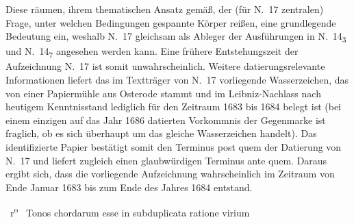\begin{ledgroup}
{Diese räumen, ihrem thematischen Ansatz gemäß, der (für N.~17 zentralen) Frage, unter welchen Bedingungen gespannte Körper reißen, eine grundlegende Bedeutung ein, weshalb N.~17 gleichsam als Ableger der Ausführungen in N.~14\textsubscript{3} und N.~14\textsubscript{7} angesehen werden kann.
Eine frühere Entstehungszeit der Aufzeichnung N.~17 ist somit unwahrscheinlich.
}%
\pend%
\pstart%
\footnotesize{
Weitere datierungsrelevante Informationen liefert das im Textträger von N.~17 vorliegende Wasserzeichen, das von einer Papiermühle aus Osterode stammt und im Leibniz-Nachlass nach heutigem Kenntnisstand lediglich für den Zeitraum 1683 bis 1684 belegt ist (bei einem einzigen auf das Jahr 1686 datierten Vorkommnis der Gegenmarke ist fraglich, ob es sich überhaupt um das gleiche Wasserzeichen handelt).%
\protect{}%
\protect{}
Das identifizierte Papier bestätigt somit den Terminus post quem der Datierung von N.~17 und liefert zugleich einen glaubwürdigen Terminus ante quem.
Daraus ergibt sich, dass die vorliegende Aufzeichnung wahrscheinlich im Zeitraum von Ende Januar 1683 bis zum Ende des Jahres 1684 entstand.
}%
\pend
\end{ledgroup}
\newpage
%
%
\count{}
\count{}
\count{}
\pstart%
\normalsize%
\noindent%
%
~r\textsuperscript{o}\rbrack\ %
%
%
Tonos chordarum\protect{}
esse in subduplicata ratione virium
